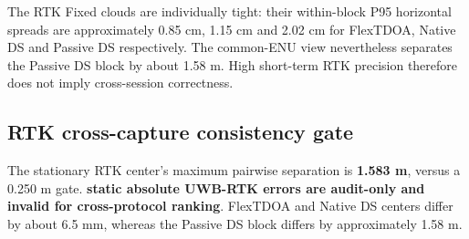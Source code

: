 \documentclass[10pt,a4paper]{article}
\begin{document}
The RTK Fixed clouds are individually tight: their within-block P95 horizontal
spreads are approximately 0.85 cm, 1.15 cm and 2.02 cm for FlexTDOA, Native DS
and Passive DS respectively. The common-ENU view nevertheless separates the
Passive DS block by about 1.58 m. High short-term RTK precision therefore does
not imply cross-session correctness.

\subsection{RTK cross-capture consistency gate}
The stationary RTK center's maximum pairwise separation is \textbf{1.583 m}, versus a 0.250 m gate. \textbf{static absolute UWB-RTK errors are audit-only and invalid for cross-protocol ranking}. FlexTDOA and Native DS centers differ by about 6.5 mm, whereas the Passive DS block differs by approximately 1.58 m.
\end{document}
